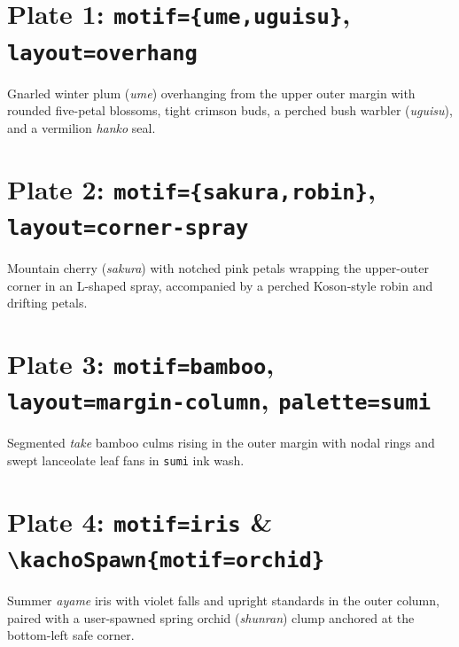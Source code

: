 \documentclass[11pt,a4paper,twoside]{article}
\begin{document}

\section*{Plate 1: \texttt{motif=\{ume,uguisu\}}, \texttt{layout=overhang}}
Gnarled winter plum (\emph{ume}) overhanging from the upper outer margin with rounded five-petal blossoms, tight crimson buds, a perched bush warbler (\emph{uguisu}), and a vermilion \emph{hanko} seal.
\clearpage

\section*{Plate 2: \texttt{motif=\{sakura,robin\}}, \texttt{layout=corner-spray}}
Mountain cherry (\emph{sakura}) with notched pink petals wrapping the upper-outer corner in an L-shaped spray, accompanied by a perched Koson-style robin and drifting petals.
\clearpage

\section*{Plate 3: \texttt{motif=bamboo}, \texttt{layout=margin-column}, \texttt{palette=sumi}}
Segmented \emph{take} bamboo culms rising in the outer margin with nodal rings and swept lanceolate leaf fans in \texttt{sumi} ink wash.
\clearpage

\section*{Plate 4: \texttt{motif=iris} \& \texttt{\textbackslash kachoSpawn\{motif=orchid\}}}
Summer \emph{ayame} iris with violet falls and upright standards in the outer column, paired with a user-spawned spring orchid (\emph{shunran}) clump anchored at the bottom-left safe corner.
\clearpage
\end{document}
